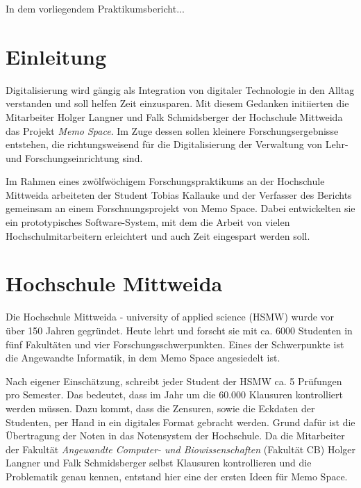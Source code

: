 \documentclass[notables, nomenclature, oneside, 150]{HSMW-Thesis}
\begin{document}
\begin{Referat}
In dem vorliegendem Praktikumsbericht...

\end{Referat}


\Hauptteil


\chapter{Einleitung}
	Digitalisierung wird gängig als Integration von digitaler Technologie in den Alltag verstanden und soll helfen Zeit einzusparen. Mit diesem Gedanken initiierten die Mitarbeiter Holger Langner und Falk Schmidsberger der Hochschule Mittweida das Projekt \textit{Memo Space}. Im Zuge dessen sollen kleinere Forschungsergebnisse entstehen, die richtungsweisend für die Digitalisierung der Verwaltung von Lehr- und Forschungseinrichtung sind.

	Im Rahmen eines zwölfwöchigem Forschungspraktikums an der Hochschule Mittweida arbeiteten der Student Tobias Kallauke und der Verfasser des Berichts gemeinsam an einem Forschnungsprojekt von Memo Space. Dabei entwickelten sie ein prototypisches Software-System, mit dem die Arbeit von vielen Hochschulmitarbeitern erleichtert und auch Zeit eingespart werden soll.


\chapter{Hochschule Mittweida}
	Die Hochschule Mittweida - university of applied science (HSMW)  wurde vor über 150 Jahren gegründet. Heute lehrt und forscht sie mit ca. 6000 Studenten in fünf Fakultäten und vier Forschungsschwerpunkten\cite{hochschule_mittweida_hochschule_nodate}. Eines der Schwerpunkte ist die Angewandte Informatik, in dem Memo Space angesiedelt ist.
	
	Nach eigener Einschätzung, schreibt jeder Student der HSMW ca. 5 Prüfungen pro Semester. Das bedeutet, dass im Jahr um die 60.000 Klausuren kontrolliert werden müssen. Dazu kommt, dass die Zensuren, sowie die Eckdaten der Studenten, per Hand in ein digitales Format gebracht werden. Grund dafür ist die Übertragung der Noten in das Notensystem der Hochschule. Da die Mitarbeiter der Fakultät \textit{Angewandte Computer- und Biowissenschaften} (Fakultät CB) Holger Langner und Falk Schmidsberger selbst Klausuren kontrollieren und die Problematik genau kennen, entstand hier eine der ersten Ideen für Memo Space.
\end{document}
